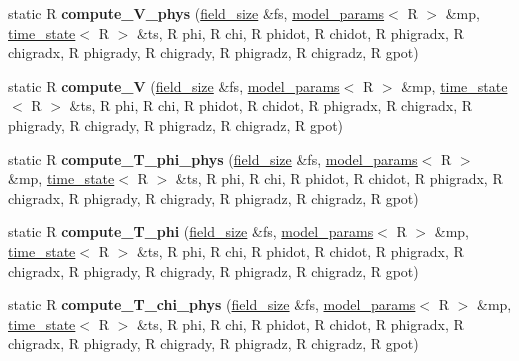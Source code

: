 \begin{DoxyCompactItemize}
\item 
\hypertarget{structgrid__funcs_a7885ccd2de4b13fa5f62e2a54bc024c3}{
static R {\bfseries compute\_\-V\_\-phys} (\hyperlink{structfield__size}{field\_\-size} \&fs, \hyperlink{structmodel__params}{model\_\-params}$<$ R $>$ \&mp, \hyperlink{structtime__state}{time\_\-state}$<$ R $>$ \&ts, R phi, R chi, R phidot, R chidot, R phigradx, R chigradx, R phigrady, R chigrady, R phigradz, R chigradz, R gpot)}
\label{structgrid__funcs_a7885ccd2de4b13fa5f62e2a54bc024c3}

\item 
\hypertarget{structgrid__funcs_ab66e81d76717db7a9ea1253563831fde}{
static R {\bfseries compute\_\-V} (\hyperlink{structfield__size}{field\_\-size} \&fs, \hyperlink{structmodel__params}{model\_\-params}$<$ R $>$ \&mp, \hyperlink{structtime__state}{time\_\-state}$<$ R $>$ \&ts, R phi, R chi, R phidot, R chidot, R phigradx, R chigradx, R phigrady, R chigrady, R phigradz, R chigradz, R gpot)}
\label{structgrid__funcs_ab66e81d76717db7a9ea1253563831fde}

\item 
\hypertarget{structgrid__funcs_af073a8df257142a29b92fac7fb0ec993}{
static R {\bfseries compute\_\-T\_\-phi\_\-phys} (\hyperlink{structfield__size}{field\_\-size} \&fs, \hyperlink{structmodel__params}{model\_\-params}$<$ R $>$ \&mp, \hyperlink{structtime__state}{time\_\-state}$<$ R $>$ \&ts, R phi, R chi, R phidot, R chidot, R phigradx, R chigradx, R phigrady, R chigrady, R phigradz, R chigradz, R gpot)}
\label{structgrid__funcs_af073a8df257142a29b92fac7fb0ec993}

\item 
\hypertarget{structgrid__funcs_aacdcb65b1a377908aa13b2af20fb1d4a}{
static R {\bfseries compute\_\-T\_\-phi} (\hyperlink{structfield__size}{field\_\-size} \&fs, \hyperlink{structmodel__params}{model\_\-params}$<$ R $>$ \&mp, \hyperlink{structtime__state}{time\_\-state}$<$ R $>$ \&ts, R phi, R chi, R phidot, R chidot, R phigradx, R chigradx, R phigrady, R chigrady, R phigradz, R chigradz, R gpot)}
\label{structgrid__funcs_aacdcb65b1a377908aa13b2af20fb1d4a}

\item 
\hypertarget{structgrid__funcs_a0d8a5ce997dcb955a54e960f803aa0bb}{
static R {\bfseries compute\_\-T\_\-chi\_\-phys} (\hyperlink{structfield__size}{field\_\-size} \&fs, \hyperlink{structmodel__params}{model\_\-params}$<$ R $>$ \&mp, \hyperlink{structtime__state}{time\_\-state}$<$ R $>$ \&ts, R phi, R chi, R phidot, R chidot, R phigradx, R chigradx, R phigrady, R chigrady, R phigradz, R chigradz, R gpot)}
\label{structgrid__funcs_a0d8a5ce997dcb955a54e960f803aa0bb}


\end{DoxyCompactItemize}
